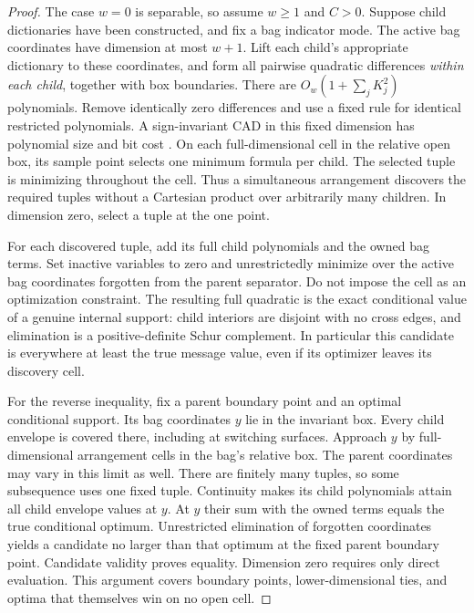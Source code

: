 \begin{proof}
The case $w=0$ is separable, so assume $w\ge1$ and $C>0$.
Suppose child dictionaries have been constructed, and fix a bag indicator
mode. The active bag coordinates have dimension at most $w+1$. Lift each
child's appropriate dictionary to these coordinates, and form all pairwise
quadratic differences \emph{within each child}, together with box boundaries.
There are $O_w(1+\sum_j K_j^2)$ polynomials. Remove identically zero
differences and use a fixed rule for identical restricted polynomials.
A sign-invariant CAD in this fixed dimension has polynomial size and bit
cost \cite[Introduction]{ArnonCAD}. On each full-dimensional cell in the
relative open box, its sample point selects one minimum formula per child.
The selected tuple is minimizing throughout the cell. Thus a simultaneous
arrangement discovers the required tuples without a Cartesian product over
arbitrarily many children. In dimension zero, select a tuple at the one point.

For each discovered tuple, add its full child polynomials and the owned bag
terms. Set inactive variables to zero and unrestrictedly minimize over the
active bag coordinates forgotten from the parent separator. Do not impose
the cell as an optimization constraint. The resulting full quadratic is
the exact conditional value of a genuine internal support: child interiors
are disjoint with no cross edges, and elimination is a positive-definite
Schur complement. In particular this candidate is everywhere at least the
true message value, even if its optimizer leaves its discovery cell.

For the reverse inequality, fix a parent boundary point and an optimal
conditional support. Its bag coordinates $y$ lie in the invariant box.
Every child envelope is covered there, including at switching surfaces.
Approach $y$ by full-dimensional arrangement cells in the bag's relative
box. The parent coordinates may vary in this limit as well. There are
finitely many tuples, so some subsequence uses one fixed tuple. Continuity
makes its child polynomials attain all child envelope values at $y$.
At $y$ their sum with the owned terms equals the true conditional optimum.
Unrestricted elimination of forgotten coordinates yields a candidate no
larger than that optimum at the fixed parent boundary point. Candidate
validity proves equality. Dimension zero requires only direct evaluation.
This argument covers boundary points, lower-dimensional ties, and optima
that themselves win on no open cell.


\end{proof}
